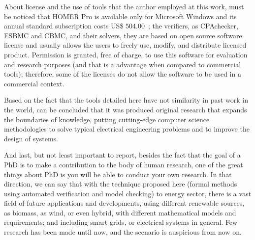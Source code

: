 About license and the use of tools that the author employed at this work, must be noticed that HOMER Pro is available only for Microsoft Windows and its annual standard subscription costs US\$ $504.00$~\cite{HOMER}; the verifiers, as CPAchecker, ESBMC and CBMC, and their solvers, they are  based on open source software license and usually allows the users to freely use, modify, and distribute licensed product. Permission is granted, free of charge, to use this software for evaluation and research purposes (and that is a advantage when compared to commercial tools); therefore, some of the licenses do not allow the software to be used in a commercial context.

Based on the fact that the tools detailed here have not similarity in past work in the world, can be concluded that it was produced original research that expands the boundaries of knowledge, putting cutting-edge computer science methodologies to solve typical electrical engineering problems and to improve the design of systems.

And last, but not least important to report, besides the fact that the goal of a PhD is to make a contribution to the body of human research, one of the great things about PhD is you will be able to conduct your own research. In that direction, we can say that with the technique proposed here (formal methods using automated verification and model checking) to energy sector, there is a vast field of future applications and developments, using different renewable sources, as biomass, as wind, or even hybrid, with different mathematical models and requirements; and including smart grids, or electrical systems in general. Few research has been made until now, and the scenario is auspicious from now on.

